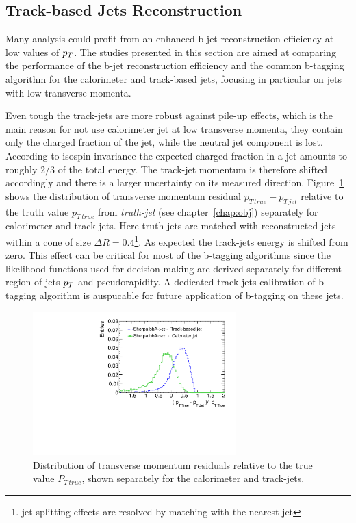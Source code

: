 \subsection{Track-based Jets Reconstruction}
Many analysis could profit from an enhanced b-jet reconstruction efficiency at low values of $p_{T}$. 
The studies presented in this section are aimed at comparing the  performance of the b-jet reconstruction 
efficiency and the common b-tagging algorithm for the calorimeter and track-based jets, focusing in particular on jets 
with low transverse momenta.

Even tough the track-jets are more robust against  pile-up effects, which is the main reason for 
not use calorimeter jet at low transverse momenta, they contain only the charged fraction of the jet, 
while the neutral jet component is lost.
According to isospin invariance the expected charged fraction in a jet amounts to roughly $2/3$ of the total energy.
The track-jet momentum is therefore shifted accordingly and there is a larger 
uncertainty on its measured direction. Figure~\ref{fig:residuals} shows the 
distribution of transverse momentum residual $p_{T\,true} - p_{T\,jet}$ relative to the truth value $p_{T\,true}$ 
from \emph{truth-jet} (see chapter~\ref{chap:obj}) separately for calorimeter and track-jets.
Here truth-jets are matched with reconstructed jets within a cone of size  $\Delta R = 0.4$\footnote{jet splitting effects are resolved by matching with the nearest jet}.
As expected the track-jets energy is shifted from zero. This effect can be critical for most of the b-tagging algorithms 
since the likelihood functions used for decision making are derived separately for different region
of jets $p_{T}$ and pseudorapidity. A dedicated track-jets calibration of b-tagging algorithm is auspucable 
for  future application of b-tagging on these jets.

\begin{figure}[tp]
\centering
\includegraphics[width=0.7\textwidth]{figure/trackjet/residuals2.pdf}
\caption{Distribution of transverse momentum residuals relative to the true value $P_{T \, true}$,
shown separately for the calorimeter and track-jets.}
\label{fig:residuals}
\end{figure}    

